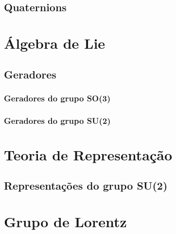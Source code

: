 \documentclass{article}
\begin{document}
\subsection{Quaternions}
\section{Álgebra de Lie}
\subsection{Geradores}
\subsubsection{Geradores do grupo SO(3)}
\subsubsection{Geradores do grupo SU(2)}
\section{Teoria de Representação}
\subsection{Representações do grupo SU(2)}
\section{Grupo de Lorentz}


\pagebreak
\nocite{*}


\end{document}
